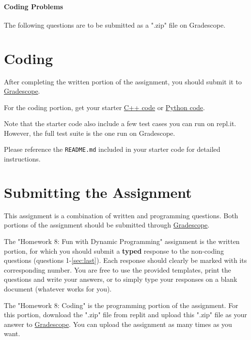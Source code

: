 \documentclass [12pt]{article}
\begin{document}
\pagebreak
\begin{Instruction}

\paragraph{Coding Problems} The following questions are to be submitted as a ".zip" file on Gradescope. 

\end{Instruction}

\section{Coding }
After completing the written portion of the assignment, you should submit it to \href{https://www.gradescope.com/courses/350304}{Gradescope}.

For the coding portion, get your starter \href{https://replit.com/team/COMP285/HW7-Code}{C++ code} or \href{https://replit.com/team/COMP285/HW7-Code-Python}{Python code}.

Note that the starter code also include a few test cases you can run on repl.it. However, the full test suite is the one run on Gradescope.

Please reference the \texttt{README.md} included in your starter code for detailed instructions.

\section*{Submitting the Assignment}

This assignment is a combination of written and programming questions. Both portions of the assignment should be submitted through \href{https://www.gradescope.com/courses/350304}{Gradescope}.

The "Homework 8: Fun with Dynamic Programming" assignment is the written portion, for which you should submit a \textbf{typed} response to the non-coding questions (questions 1-\ref{sec:last}). Each response should clearly be marked with its corresponding number. You are free to use the provided templates, print the questions and write your answers, or to simply type your responses on a blank document (whatever works for you).

The "Homework 8: Coding" is the programming portion of the assignment. For this portion, download the ".zip" file from replit and upload this ".zip" file as your answer to \href{https://www.gradescope.com/courses/350304}{Gradescope}. You can upload the assignment as many times as you want.
\end{document}
